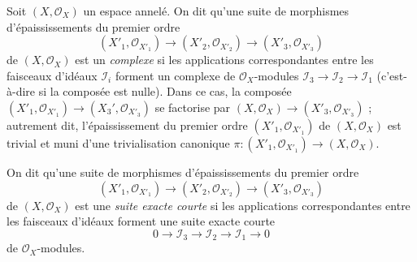 \begin{remark}
\label{remark-short-exact-sequence-thickenings}
Soit $(X, \mathcal{O}_X)$ un espace annelé. On dit qu'une suite de morphismes
d'épaississements du premier ordre
$$
(X'_1, \mathcal{O}_{X'_1}) \to
(X'_2, \mathcal{O}_{X'_2}) \to
(X'_3, \mathcal{O}_{X'_3})
$$
de $(X, \mathcal{O}_X)$ est un {\it complexe}
si les applications correspondantes entre
les faisceaux d'idéaux $\mathcal{I}_i$
forment un complexe de $\mathcal{O}_X$-modules
$\mathcal{I}_3 \to \mathcal{I}_2 \to \mathcal{I}_1$
(c'est-à-dire si la composée est nulle). Dans ce cas, la composée
$(X'_1, \mathcal{O}_{X'_1}) \to (X_3', \mathcal{O}_{X'_3})$ se factorise par
$(X, \mathcal{O}_X) \to (X'_3, \mathcal{O}_{X'_3})$ ; autrement dit,
l'épaississement du premier ordre $(X'_1, \mathcal{O}_{X'_1})$ de
$(X, \mathcal{O}_X)$ est trivial et muni d'une
trivialisation canonique
$\pi : (X'_1, \mathcal{O}_{X'_1}) \to (X, \mathcal{O}_X)$.

\medskip\noindent
On dit qu'une suite de morphismes d'épaississements du premier ordre
$$
(X'_1, \mathcal{O}_{X'_1}) \to
(X'_2, \mathcal{O}_{X'_2}) \to
(X'_3, \mathcal{O}_{X'_3})
$$
de $(X, \mathcal{O}_X)$ est une {\it suite exacte courte} si les
applications correspondantes entre les faisceaux d'idéaux forment une suite exacte courte
$$
0 \to \mathcal{I}_3 \to \mathcal{I}_2 \to \mathcal{I}_1 \to 0
$$
de $\mathcal{O}_X$-modules.
\end{remark}

